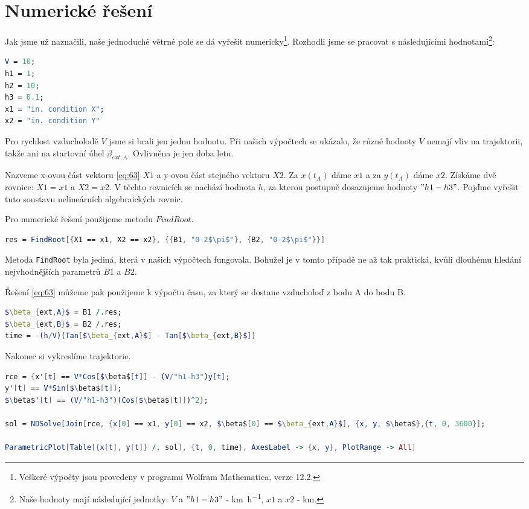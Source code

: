 \documentclass[reqno, a4paper]{amsart}
\numberwithin{equation}{section}
\begin{document}
\section{Numerické řešení}
\label{sec:NumJVP}
Jak jsme už naznačili, naše jednoduché větrné pole se dá vyřešit numericky\footnote{Veškeré výpočty jsou provedeny v programu Wolfram Mathematica, verze 12.2.}. Rozhodli jsme se pracovat s následujícími hodnotami\footnote{Naše hodnoty mají následující jednotky: $V$ a $"h1-h3"$ - \si{km.h^{-1}}, $x1$ a $x2$ - \si{km}.}:
\begin{lstlisting}[language=Mathematica, caption=Hodnoty]
V = 10;
h1 = 1;
h2 = 10;
h3 = 0.1;
x1 = "in. condition X";
x2 = "in. condition Y"
\end{lstlisting}

Pro rychlost vzducholodě $V$ jsme si brali jen jednu hodnotu. Při našich výpočtech se ukázalo, že různé hodnoty $V$ nemají vliv na trajektorii, takže ani na startovní úhel $\beta_{ext,A}$. Ovlivněna je jen doba letu.

Nazveme x-ovou část vektoru \eqref{eq:63} $X1$ a y-ovou část stejného vektoru $X2$. Za $x(t_{A})$ dáme $x1$ a za $y(t_{A})$ dáme $x2$. Získáme dvě rovnice: $X1=x1$ a $X2=x2$. V těchto rovnicích se nachází hodnota $h$, za kterou postupně dosazujeme hodnoty $"h1-h3"$. Pojďme vyřešit tuto soustavu nelineárních algebraických rovnic.

Pro numerické řešení použijeme metodu $FindRoot$. 
 
\begin{lstlisting}[language=Mathematica, caption=Metoda řešení,mathescape]
res = FindRoot[{X1 == x1, X2 == x2}, {{B1, "0-2$\pi$"}, {B2, "0-2$\pi$"}}]
\end{lstlisting}

Metoda \texttt{FindRoot} byla jediná, která v našich výpočtech fungovala. Bohužel je v tomto případě ne až tak praktická, kvůli dlouhému hledání nejvhodnějších parametrů $B1$ a $B2$.

Řešení \eqref{eq:63} můžeme pak použijeme k výpočtu času, za který se dostane vzducholoď z bodu A do bodu B.

\begin{lstlisting}[language=Mathematica, caption=Výpočet času,mathescape]
$\beta_{ext,A}$ = B1 /.res;
$\beta_{ext,B}$ = B2 /.res;
time = -(h/V)(Tan[$\beta_{ext,A}$] - Tan[$\beta_{ext,B}$])
\end{lstlisting}

Nakonec si vykreslíme trajektorie.
\begin{lstlisting}[language=Mathematica, caption=Vykreslení trajektorie,mathescape]
rce = {x'[t] == V*Cos[$\beta$[t]] - (V/"h1-h3")y[t];
y'[t] == V*Sin[$\beta$[t]];
$\beta$'[t] == (V/"h1-h3")(Cos[$\beta$[t]])^2};

sol = NDSolve[Join[rce, {x[0] == x1, y[0] == x2, $\beta$[0] == $\beta_{ext,A}$], {x, y, $\beta$},{t, 0, 3600}];

ParametricPlot[Table[{x[t], y[t]} /. sol], {t, 0, time}, AxesLabel -> {x, y}, PlotRange -> All]
\end{lstlisting}
\end{document}
